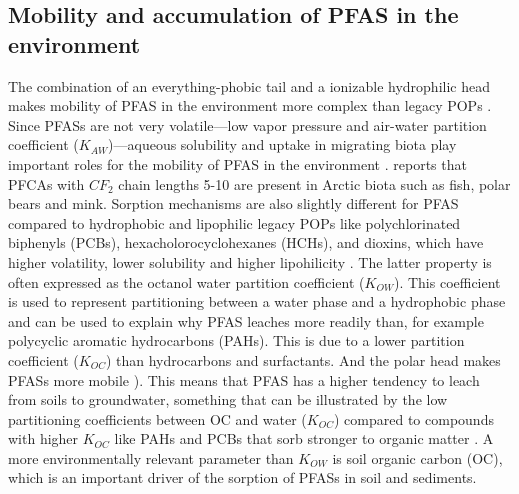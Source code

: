 \subsection{Mobility and accumulation of PFAS in the environment}
The combination of an everything-phobic tail and a ionizable hydrophilic head makes mobility of PFAS in the environment more complex than legacy POPs \citep{cabrerizo2018legacy,Arp2006}. Since PFASs are not very volatile---low vapor pressure and air-water partition coefficient ($K_{AW}$)---aqueous solubility and uptake in migrating biota play important roles for the mobility of PFAS in the environment \citep{Arp2006}. \cite{Schlabach2017} reports that PFCAs with $CF_2$ chain lengths 5-10 are present in Arctic biota such as fish, polar bears and mink. Sorption mechanisms are also slightly different for PFAS compared to hydrophobic and lipophilic legacy POPs like polychlorinated biphenyls (PCBs), hexacholorocyclohexanes (HCHs), and dioxins, which have higher volatility, lower solubility and higher lipohilicity \citep{cabrerizo2018legacy,Cornelissen2005,li2018}. The latter property is often expressed as the octanol water partition coefficient (\(K_{OW}\)). This coefficient is used to represent partitioning between a water phase and a hydrophobic phase \citep{Reemtsma2016} and can be used to explain why PFAS leaches more readily than, for example polycyclic aromatic hydrocarbons (PAHs). This is due to a lower partition coefficient ($K_{OC}$) than hydrocarbons and surfactants. And the polar head makes PFASs more mobile \citep{Cornelissen2005,du2014adsorption}). This means that PFAS has a higher tendency to leach from soils to groundwater, something that can be illustrated by the low partitioning coefficients between OC and water ($K_{OC}$) compared to compounds with higher $K_{OC}$ like PAHs and PCBs that sorb stronger to organic matter \citep{Cornelissen2005}. A more environmentally relevant parameter than \(K_{OW}\) is soil organic carbon (OC), which is an important driver of the sorption of PFASs in soil and sediments.

